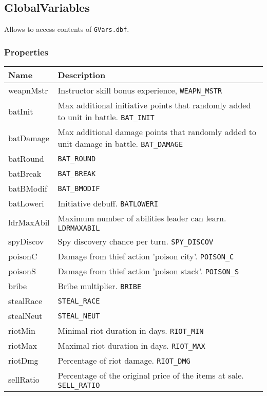 \subsection{GlobalVariables}
\label{GlobalVariables}
Allows to access contents of \texttt{GVars.dbf}.
\subsubsection{Properties}
\begin{center}
\begin{tabularx}{\linewidth}{| l | X |}
\hline
\textbf{Name} & \textbf{Description}\\
\hline
weapnMstr & Instructor skill bonus experience, \texttt{WEAPN\_MSTR}\\
\hline
batInit & Max additional initiative points that randomly added to unit in battle. \texttt{BAT\_INIT}\\
\hline
batDamage & Max additional damage points that randomly added to unit damage in battle. \texttt{BAT\_DAMAGE}\\
\hline
batRound & \texttt{BAT\_ROUND}\\
\hline
batBreak & \texttt{BAT\_BREAK}\\
\hline
batBModif & \texttt{BAT\_BMODIF}\\
\hline
batLoweri & Initiative debuff. \texttt{BATLOWERI}\\
\hline
ldrMaxAbil & Maximum number of abilities leader can learn. \texttt{LDRMAXABIL}\\
\hline
spyDiscov & Spy discovery chance per turn. \texttt{SPY\_DISCOV}\\
\hline
poisonC & Damage from thief action 'poison city'. \texttt{POISON\_C}\\
\hline
poisonS & Damage from thief action 'poison stack'. \texttt{POISON\_S}\\
\hline
bribe & Bribe multiplier. \texttt{BRIBE}\\
\hline
stealRace & \texttt{STEAL\_RACE}\\
\hline
stealNeut & \texttt{STEAL\_NEUT}\\
\hline
riotMin & Minimal riot duration in days. \texttt{RIOT\_MIN}\\
\hline
riotMax & Maximal riot duration in days. \texttt{RIOT\_MAX}\\
\hline
riotDmg & Percentage of riot damage. \texttt{RIOT\_DMG}\\
\hline
sellRatio & Percentage of the original price of the items at sale. \texttt{SELL\_RATIO}\\

\end{tabularx}
\end{center}
